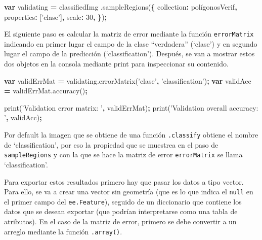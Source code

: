 \documentclass[
]{article}
\newenvironment{Shaded}{\begin{snugshade}}{\end{snugshade}}
\newcommand{\AttributeTok}[1]{\textcolor[rgb]{0.77,0.63,0.00}{#1}}
\newcommand{\DataTypeTok}[1]{\textcolor[rgb]{0.13,0.29,0.53}{#1}}
\newcommand{\DecValTok}[1]{\textcolor[rgb]{0.00,0.00,0.81}{#1}}
\newcommand{\KeywordTok}[1]{\textcolor[rgb]{0.13,0.29,0.53}{\textbf{#1}}}
\newcommand{\NormalTok}[1]{#1}
\newcommand{\OperatorTok}[1]{\textcolor[rgb]{0.81,0.36,0.00}{\textbf{#1}}}
\newcommand{\StringTok}[1]{\textcolor[rgb]{0.31,0.60,0.02}{#1}}
\newcommand{\VariableTok}[1]{\textcolor[rgb]{0.00,0.00,0.00}{#1}}
\begin{document}
\begin{Shaded}
\begin{Highlighting}[]
\KeywordTok{var}\NormalTok{ validating }\OperatorTok{=}\NormalTok{ classifiedImg}
\NormalTok{  .}\AttributeTok{sampleRegions}\NormalTok{(}\OperatorTok{\{}
  \DataTypeTok{collection}\OperatorTok{:}\NormalTok{ polígonosVerif}\OperatorTok{,}
  \DataTypeTok{properties}\OperatorTok{:}\NormalTok{ [}\StringTok{'clase'}\NormalTok{]}\OperatorTok{,}
  \DataTypeTok{scale}\OperatorTok{:} \DecValTok{30}\OperatorTok{,}
\OperatorTok{\}}\NormalTok{)}\OperatorTok{;}
\end{Highlighting}
\end{Shaded}

El siguiente paso es calcular la matriz de error mediante la función
\texttt{errorMatrix} indicando en primer lugar el campo de la clase
``verdadera'' (`clase') y en segundo lugar el campo de la predicción
(`classification'). Después, se van a mostrar estos dos objetos en la
consola mediante print para inspeccionar su contenido.

\begin{Shaded}
\begin{Highlighting}[]
\KeywordTok{var}\NormalTok{ validErrMat }\OperatorTok{=} \VariableTok{validating}\NormalTok{.}\AttributeTok{errorMatrix}\NormalTok{(}\StringTok{'clase'}\OperatorTok{,} \StringTok{'classification'}\NormalTok{)}\OperatorTok{;}
\KeywordTok{var}\NormalTok{ validAcc }\OperatorTok{=} \VariableTok{validErrMat}\NormalTok{.}\AttributeTok{accuracy}\NormalTok{()}\OperatorTok{;}

\AttributeTok{print}\NormalTok{(}\StringTok{'Validation error matrix: '}\OperatorTok{,}\NormalTok{ validErrMat)}\OperatorTok{;}
\AttributeTok{print}\NormalTok{(}\StringTok{'Validation overall accuracy: '}\OperatorTok{,}\NormalTok{ validAcc)}\OperatorTok{;}
\end{Highlighting}
\end{Shaded}

\begin{tipblock}
Por default la imagen que se obtiene de una función \texttt{.classify}
obtiene el nombre de `classification', por eso la propiedad que se
muestrea en el paso de \texttt{sampleRegions} y con la que se hace la
matriz de error \texttt{errorMatrix} se llama `classification'.

\end{tipblock}

Para exportar estos resultados primero hay que pasar los datos a tipo
vector. Para ello, se va a crear una vector sin geometría (que es lo que
indica el \texttt{null} en el primer campo del \texttt{ee.Feature}),
seguido de un diccionario que contiene los datos que se desean exportar
(que podrían interpretarse como una tabla de atributos). En el caso de
la matriz de error, primero se debe convertir a un arreglo mediante la
función \texttt{.array()}.
\end{document}
